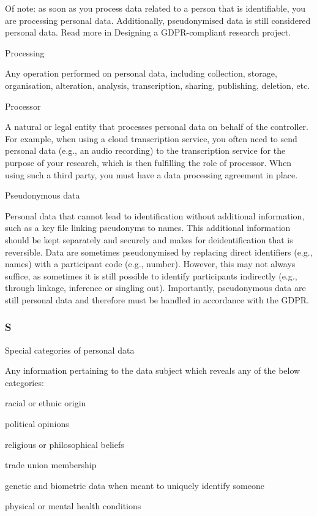 \documentclass[
]{book}
\begin{document}
Of note: as soon as you process data related to a person that is identifiable, you are processing personal data. Additionally,
pseudonymised data is still considered personal data. Read more in Designing a GDPR-compliant research project.

Processing

Any operation performed on personal data, including collection, storage, organisation, alteration, analysis,
transcription, sharing, publishing, deletion, etc.

Processor

A natural or legal entity that processes personal data on behalf of the controller. For example, when using
a cloud transcription service, you often need to send personal data (e.g., an audio recording) to the transcription
service for the purpose of your research, which is then fulfilling the role of processor. When using such a third party,
you must have a data processing agreement in place.

Pseudonymous data

Personal data that cannot lead to identification without additional information,
such as a key file linking pseudonyms to names. This additional information should be kept separately and securely
and makes for deidentification that is reversible. Data are sometimes pseudonymised by replacing direct identifiers
(e.g., names) with a participant code (e.g., number). However, this may not always suffice, as sometimes it is still
possible to identify participants indirectly (e.g., through linkage, inference or singling out). Importantly, pseudonymous
data are still personal data and therefore must be handled in accordance with the GDPR.

\hypertarget{s}{%
\subsubsection{S}\label{s}}

Special categories of personal data

Any information pertaining to the data subject which reveals any of the below categories:

racial or ethnic origin

political opinions

religious or philosophical beliefs

trade union membership

genetic and biometric data when meant to uniquely identify someone

physical or mental health conditions
\end{document}
